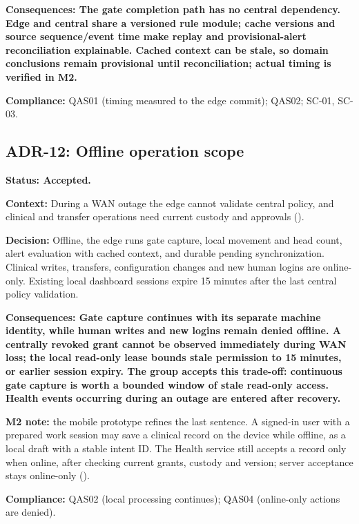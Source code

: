 \textbf{Consequences: The gate completion path has no central
dependency. Edge and central share a versioned rule module; cache
versions and source sequence/event time make replay and
provisional-alert reconciliation explainable. Cached context can be
stale, so domain conclusions remain provisional until reconciliation;
actual timing is verified in M2.}

\textbf{Compliance:} QAS01 (timing measured to the edge commit); QAS02;
SC-01, SC-03.

\subsection{ADR-12: Offline operation scope}\label{adr:12}

\textbf{Status: Accepted.}

\textbf{Context:} During a WAN outage the edge cannot validate central
policy, and clinical and transfer operations need current custody and
approvals ().

\textbf{Decision:} Offline, the edge runs gate capture, local movement
and head count, alert evaluation with cached context, and durable
pending synchronization. Clinical writes, transfers, configuration
changes and new human logins are online-only. Existing local dashboard
sessions expire 15 minutes after the last central policy
validation.

\textbf{Consequences: Gate capture continues with its separate machine
identity, while human writes and new logins remain denied offline. A
centrally revoked grant cannot be observed immediately during WAN loss;
the local read-only lease bounds stale permission to 15 minutes, or earlier session expiry. The group accepts this trade-off:
continuous gate capture is worth a bounded window of stale read-only
access. Health events occurring during an outage are entered after
recovery.}

\textbf{M2 note:} the mobile prototype refines the last sentence. A
signed-in user with a prepared work session may save a clinical record
on the device while offline, as a local draft with a stable intent ID.
The Health service still accepts a record only when online, after
checking current grants, custody and version; server acceptance stays
online-only ().

\textbf{Compliance:} QAS02 (local processing continues); QAS04
(online-only actions are denied).
